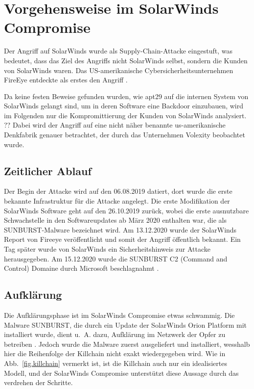 \documentclass[conference]{IEEEtran}
\begin{document}
\section{Vorgehensweise im SolarWinds Compromise}

Der Angriff auf SolarWinds wurde als Supply-Chain-Attacke eingestuft, was bedeutet, dass das Ziel des Angriffs nicht SolarWinds selbst, sondern die Kunden von SolarWinds waren.
Das US-amerikanische Cybersicherheitsunternehmen FireEye entdeckte als erstes den Angriff \cite{9579611}.

Da keine festen Beweise gefunden wurden, wie \ac{apt}29 auf die internen System von SolarWinds gelangt sind, um in deren Software eine Backdoor einzubauen, wird im Folgenden nur die Kompromittierung der Kunden von SolarWinds analysiert.
?? Dabei wird der Angriff auf eine nicht näher benannte us-amerikanische Denkfabrik genauer betrachtet, der durch das Unternehmen Volexity beobachtet wurde.

\subsection{Zeitlicher Ablauf}
Der Begin der Attacke wird auf den 06.08.2019 datiert, dort wurde die erste bekannte Infrastruktur für die Attacke angelegt.
Die erste Modifikation der SolarWinds Software geht auf den 26.10.2019 zurück, wobei die erste ausnutzbare Schwachstelle in den Softwareupdates ab März 2020 enthalten war, die als SUNBURST-Malware bezeichnet wird.
Am 13.12.2020 wurde der SolarWinds Report von Fireeye veröffentlicht und somit der Angriff öffentlich bekannt.
Ein Tag später wurde von SolarWinds ein Sicherheitshinweis zur Attacke herausgegeben.
Am 15.12.2020 wurde die SUNBURST C2 (Command and Control) Domaine durch Microsoft beschlagnahmt \cite{Unit2020}.

\subsection{Aufklärung}
Die Aufklärungsphase ist im SolarWinds Compromise etwas schwammig.
Die Malware SUNBURST, die durch ein Update der SolarWinds Orion Platform mit installiert wurde, dient u.~A. dazu, Aufklärung im Netzwerk der Opfer zu betreiben \cite{Intelligence2020}.
Jedoch wurde die Malware zuerst ausgeliefert und installiert, wesshalb hier die Reihenfolge der Killchain nicht exakt wiedergegeben wird.
Wie in Abb.~\ref{fig.killchain} vermerkt ist, ist die Killchain auch nur ein idealisiertes Modell, und der SolarWinds Compromise unterstützt diese Aussage durch das verdrehen der Schritte.
\end{document}
